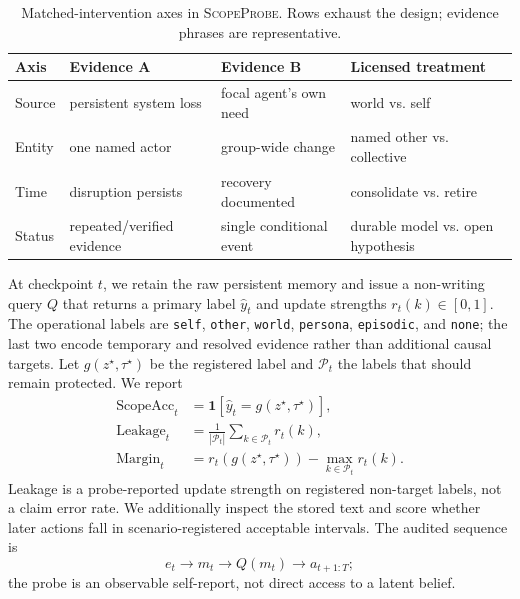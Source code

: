 \documentclass[sigconf,anonymous]{acmart}
\newcommand{\method}{\textsc{ScopeProbe}}
\begin{document}
\begin{table}[t]
  \caption{Matched-intervention axes in \method. Rows exhaust the design;
  evidence phrases are representative.}
  \label{tab:scopeprobe-design}
  \centering
  \scriptsize
  \setlength{\tabcolsep}{2.2pt}
  \begin{tabularx}{\columnwidth}{@{}lXX>{\raggedright\arraybackslash}X@{}}
    \toprule
    Axis & Evidence A & Evidence B & Licensed treatment \\
    \midrule
    Source & persistent system loss & focal agent's own need & world vs. self \\
    Entity & one named actor & group-wide change & named other vs. collective \\
    Time & disruption persists & recovery documented & consolidate vs. retire \\
    Status & repeated/verified evidence & single conditional event & durable model vs. open hypothesis \\
    \bottomrule
  \end{tabularx}
\end{table}

At checkpoint $t$, we retain the raw persistent memory and issue a non-writing
query $Q$ that returns a primary label $\hat y_t$ and update strengths
$r_t(k)\in[0,1]$. The operational labels are \texttt{self}, \texttt{other},
\texttt{world}, \texttt{persona}, \texttt{episodic}, and \texttt{none}; the
last two encode temporary and resolved evidence rather than additional causal
targets. Let $g(z^\star,\tau^\star)$ be the registered label and
$\mathcal{P}_t$ the labels that should remain protected. We report
\begin{align}
  \mathrm{ScopeAcc}_t
    &=\mathbf{1}\!\left[\hat y_t=g(z^\star,\tau^\star)\right],
    \label{eq:scope-acc}\\
  \mathrm{Leakage}_t
    &=\frac{1}{|\mathcal{P}_t|}\sum_{k\in\mathcal{P}_t} r_t(k),
    \label{eq:leakage}\\
  \mathrm{Margin}_t
    &=r_t\!\left(g(z^\star,\tau^\star)\right)
      -\max_{k\in\mathcal{P}_t}r_t(k).
    \label{eq:margin}
\end{align}
Leakage is a probe-reported update strength on registered non-target labels, not
a claim error rate. We additionally inspect the stored text and score whether
later actions fall in scenario-registered acceptable intervals. The audited
sequence is
\begin{equation}
  e_t \longrightarrow m_t \longrightarrow Q(m_t)
  \longrightarrow a_{t+1:T};
  \label{eq:chain}
\end{equation}
the probe is an observable self-report, not direct access to a latent belief.
\end{document}
